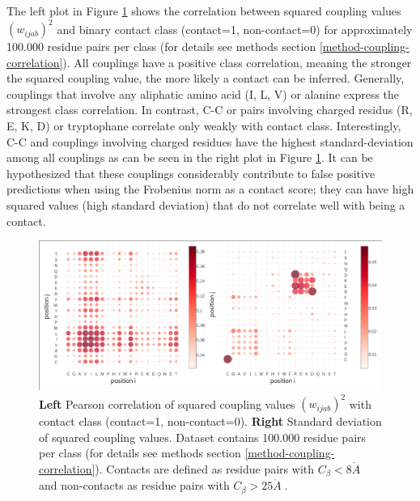 \documentclass[12pt,a4paper,twoside]{book}
\newcommand{\Cb}{C_\beta}
\newcommand{\wijab}{w_{ijab}}
\newcommand{\angstrom}{\mathring{A} \;}
\theoremstyle{definition}
\theoremstyle{definition}
\theoremstyle{remark}
\begin{document}
The left plot in Figure \ref{fig:sq-coupling-correlation} shows the
correlation between squared coupling values \((\wijab)^2\) and binary
contact class (contact=1, non-contact=0) for approximately 100.000
residue pairs per class (for details see methods section
\ref{method-coupling-correlation}). All couplings have a positive class
correlation, meaning the stronger the squared coupling value, the more
likely a contact can be inferred. Generally, couplings that involve any
aliphatic amino acid (I, L, V) or alanine express the strongest class
correlation. In contrast, C-C or pairs involving charged residus (R, E,
K, D) or tryptophane correlate only weakly with contact class.
Interestingly, C-C and couplings involving charged residues have the
highest standard-deviation among all couplings as can be seen in the
right plot in Figure \ref{fig:sq-coupling-correlation}. It can be
hypothesized that these couplings considerably contribute to false
positive predictions when using the Frobenius norm as a contact score;
they can have high squared values (high standard deviation) that do not
correlate well with being a contact.









\begin{figure}

{\centering \includegraphics[width=1\linewidth]{img/coupling_matrix_analysis/squared_couplings_correlation_and_stddev_notitle} 

}

\caption{\textbf{Left} Pearson correlation of squared
coupling values \((\wijab)^2\) with contact class (contact=1,
non-contact=0). \textbf{Right} Standard deviation of squared coupling
values. Dataset contains 100.000 residue pairs per class (for details
see methods section \ref{method-coupling-correlation}). Contacts are
defined as residue pairs with \(\Cb < 8 \angstrom\) and non-contacts as
residue pairs with \(\Cb > 25 \angstrom\).}\label{fig:sq-coupling-correlation}
\end{figure}
\end{document}
